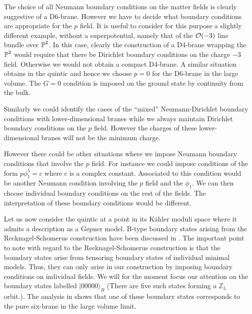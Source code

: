 \documentclass[a4paper,12pt]{article}
\def\Bbb{\mathbb}
\def\BZ{\mbox{$\Bbb Z$}} \def\BR{\mbox{$\Bbb R$}}
\begin{document}
The choice of all Neumann boundary conditions on the matter fields is
clearly suggestive of a D6-brane. However we have to decide what
boundary conditions are appropriate for the $p$ field. It is useful to
consider for this purpose a slightly different example, without a
superpotential, namely that of the ${\cal O}(-3)$ line bundle over $\BP^2$.
In this case, clearly the construction of a D4-brane wrapping the $\BP^2$
would require that there be Dirichlet boundary conditions on the charge
$-3$ field. Otherwise we would not obtain a compact D4-brane. A similar
situation obtains in the quintic and hence we choose $p=0$ for the
D6-brane in the large volume. The $G=0$ condition is imposed on the
ground state by continuity from the bulk.  

Similarly we could identify the cases of the ``mixed''
Neumann-Dirichlet boundary conditions with lower-dimensional branes
while we always maintain Dirichlet boundary conditions on the $p$
field. However the charges of these lower-dimensional branes will not be
the minimum charge.  

However there could be other situations
where we impose Neumann boundary conditions that involve the $p$ field.
For instance we could impose conditions of the form $p\phi_1^5=c$ where
$c$ is a complex constant. Associated to this condition would be another
Neumann condition involving the $p$ field and the $\phi_1$. We can
then choose individual boundary conditions on the rest of the fields.
The interpretation of these boundary conditions would be different. 

Let us now consider the quintic at a point in its K\"ahler moduli
space where it admits a description as a Gepner model. B-type
boundary states arising from the Recknagel-Schomerus construction\cite{RS}
have been discussed in \cite{quintic}. The important point to note with
regard to the Recknagel-Schomerus construction is that the boundary
states arise from tensoring boundary states of individual minimal
models. Thus, they can only arise in our construction
by imposing boundary conditions on individual fields. 
We will for the moment focus our attention on the boundary
states labelled $|00000\rangle_B$ (There are five such states forming
a $\BZ_5$ orbit.). The analysis in \cite{quintic} shows that one
of these boundary states corresponds to the pure six-brane in the
large volume limit.
\end{document}
